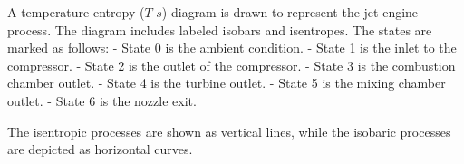 A temperature-entropy (\(T\)-\(s\)) diagram is drawn to represent the jet engine process. The diagram includes labeled isobars and isentropes. The states are marked as follows:  
- State 0 is the ambient condition.  
- State 1 is the inlet to the compressor.  
- State 2 is the outlet of the compressor.  
- State 3 is the combustion chamber outlet.  
- State 4 is the turbine outlet.  
- State 5 is the mixing chamber outlet.  
- State 6 is the nozzle exit.  

The isentropic processes are shown as vertical lines, while the isobaric processes are depicted as horizontal curves.